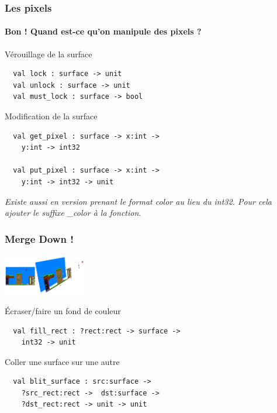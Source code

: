 \begin{frame}[fragile]
	\frametitle{Les pixels}
	\framesubtitle{\og{}Bon ! Quand est-ce qu'on manipule des pixels ?\fg}
	\begin{block}{Vérouillage de la surface}
		\begin{lstlisting}
  val lock : surface -> unit
  val unlock : surface -> unit
  val must_lock : surface -> bool
		\end{lstlisting}
	\end{block}
	\begin{block}{Modification de la surface}
		\begin{lstlisting}
  val get_pixel : surface -> x:int -> 
    y:int -> int32

  val put_pixel : surface -> x:int -> 
    y:int -> int32 -> unit
		\end{lstlisting}
		\textit{Existe aussi en version prenant le format color au lieu du int32. Pour cela ajouter le suffixe \_color à la fonction.}
	\end{block}
\end{frame}

\begin{frame}[fragile]
	\frametitle{\og{}Merge Down !\fg}
	\begin{center}
		\includegraphics[width=3.6cm]{pics/surfacesMerge.png}
	\end{center}
	\begin{block}{Écraser/faire un fond de couleur}
		\begin{lstlisting}
  val fill_rect : ?rect:rect -> surface -> 
    int32 -> unit
		\end{lstlisting}
	\end{block}
	\begin{block}{Coller une surface sur une autre}
		\begin{lstlisting}
  val blit_surface : src:surface -> 
    ?src_rect:rect ->  dst:surface -> 
    ?dst_rect:rect -> unit -> unit
		\end{lstlisting}
	\end{block}
\end{frame}

